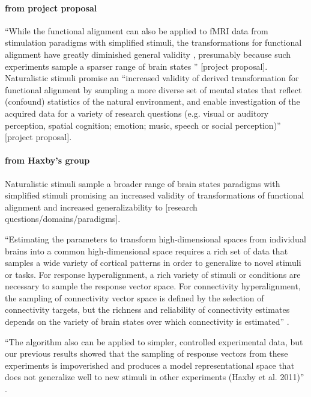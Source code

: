 \paragraph{from project proposal}
%
``While the functional alignment can also be applied to fMRI data from
stimulation paradigms with simplified stimuli, the transformations for
functional alignment have greatly diminished general validity
\citep{haxby2011common}, presumably because such experiments sample a sparser
range of brain states \citep{guntupalli2016model}'' [project proposal].
%
Naturalistic stimuli promise an ``increased validity of derived transformation
for functional alignment by sampling a more diverse set of mental states that
reflect (confound) statistics of the natural environment, and enable
investigation of the acquired data for a variety of research questions (e.g.
visual or auditory perception, spatial cognition; emotion; music, speech or
social perception)'' [project proposal].


\paragraph{from Haxby's group}

%
Naturalistic stimuli sample a broader range of brain states paradigms
with simplified stimuli \citep{guntupalli2016model, haxby2011common} promising
an increased validity of transformations of functional alignment and increased
generalizability to [research questions/domains/paradigms].

%
``Estimating the parameters to transform high-dimensional spaces from individual
brains into a common high-dimensional space requires a rich set of data that
samples a wide variety of cortical patterns in order to generalize to novel
stimuli or tasks.
%
For response hyperalignment, a rich variety of stimuli or conditions are
necessary to sample the response vector space.
%
For connectivity hyperalignment, the sampling of connectivity vector space is
defined by the selection of connectivity targets, but the richness and
reliability of connectivity estimates depends on the variety of brain states
over which connectivity is estimated'' \citep{haxby2020hyperalignment}.

%
``The algorithm also can be applied to simpler, controlled experimental data,
but our previous results showed that the sampling of response vectors from these
experiments is impoverished and produces a model representational space that
does not generalize well to new stimuli in other experiments (Haxby et al.
2011)'' \citep{guntupalli2016model}.

